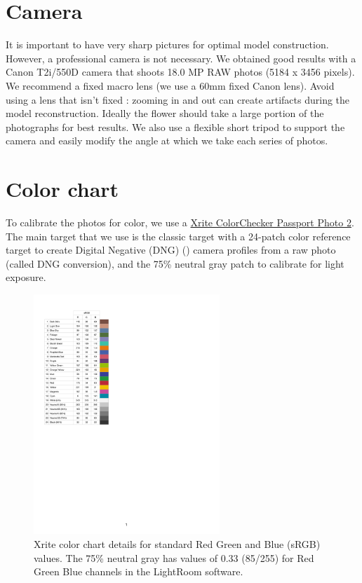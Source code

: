 \documentclass[
]{book}
\begin{document}
\hypertarget{camera}{%
\section{Camera}\label{camera}}

It is important to have very sharp pictures for optimal model
construction. However, a professional camera is not necessary. We
obtained good results with a Canon T2i/550D camera that shoots 18.0 MP
RAW photos (5184 x 3456 pixels). We recommend a fixed macro lens (we use
a 60mm fixed Canon lens). Avoid using a lens that isn't fixed : zooming
in and out can create artifacts during the model reconstruction. Ideally
the flower should take a large portion of the photographs for best
results. We also use a flexible short tripod to support the camera and
easily modify the angle at which we take each series of photos.

\hypertarget{color-chart}{%
\section{Color chart}\label{color-chart}}

To calibrate the photos for color, we use a \href{https://www.xrite.com/categories/calibration-profiling/colorchecker-classic-family/colorchecker-passport-photo-2}{Xrite ColorChecker Passport
Photo
2}.
The main target that we use is the classic target with a 24-patch color
reference target to create Digital Negative (DNG) (\citet{Adobe2012DNG}) camera
profiles from a raw photo (called DNG conversion), and the 75\% neutral
gray patch to calibrate for light exposure.

\begin{figure}
\hypertarget{fig:xrite_description}{%
\centering
\includegraphics[width=7cm,height=\textheight]{Figures/Color_chart_sRGB_values.pdf}
\caption{Xrite color chart details for standard Red Green and Blue (sRGB)
values. The 75\% neutral gray has values of 0.33 (85/255) for Red Green
Blue channels in the LightRoom
software.}\label{fig:xrite_description}
}
\end{figure}
\end{document}
